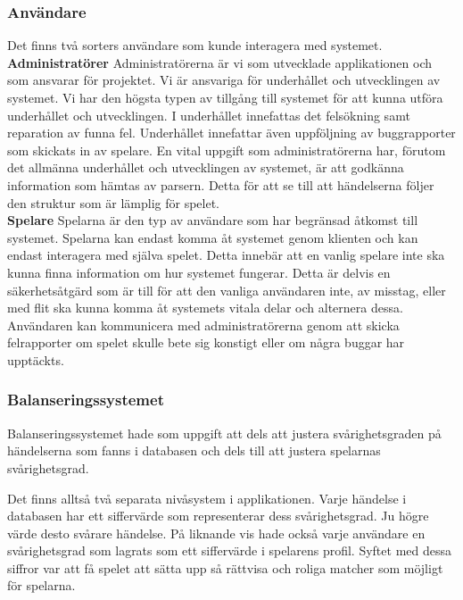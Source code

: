 \documentclass[a4paper, 11pt]{article}
\begin{document}
\subsubsection{Användare}
Det finns två sorters användare som kunde interagera med systemet.
\newline
\textbf{Administratörer} \label{admins}\newline
Administratörerna är vi som utvecklade applikationen och som ansvarar för projektet. Vi är ansvariga för underhållet och utvecklingen av systemet. Vi har den högsta typen av tillgång till systemet för att kunna utföra underhållet och utvecklingen. I underhållet innefattas det felsökning samt reparation av funna fel. Underhållet innefattar även uppföljning av buggrapporter som skickats in av spelare. En vital uppgift som administratörerna har, förutom det allmänna underhållet och utvecklingen av systemet, är att godkänna information som hämtas av parsern. Detta för att se till att händelserna följer den struktur som är lämplig för spelet.\\
\newline
\textbf{Spelare}\newline
Spelarna är den typ av användare som har begränsad åtkomst till systemet. Spelarna kan endast komma åt systemet genom klienten och kan endast interagera med själva spelet. Detta innebär att en vanlig spelare inte ska kunna finna information om hur systemet fungerar. Detta är delvis en säkerhetsåtgärd som är till för att den vanliga användaren inte, av misstag, eller med flit ska kunna komma åt systemets vitala delar och alternera dessa. Användaren kan kommunicera med administratörerna genom att skicka felrapporter om spelet skulle bete sig konstigt eller om några buggar har upptäckts.

\subsubsection{Balanseringssystemet} \label{balanseringssystemet}
Balanseringssystemet hade som uppgift att dels att justera svårighetsgraden på händelserna som fanns i databasen och dels till att justera spelarnas svårighetsgrad. 

Det finns alltså två separata nivåsystem i applikationen. Varje händelse i databasen har ett siffervärde som representerar dess svårighetsgrad. Ju högre värde desto svårare händelse. På liknande vis hade också varje användare en svårighetsgrad som lagrats som ett siffervärde i spelarens profil. Syftet med dessa siffror var att få spelet att sätta upp så rättvisa och roliga matcher som möjligt för spelarna. 
\end{document}
